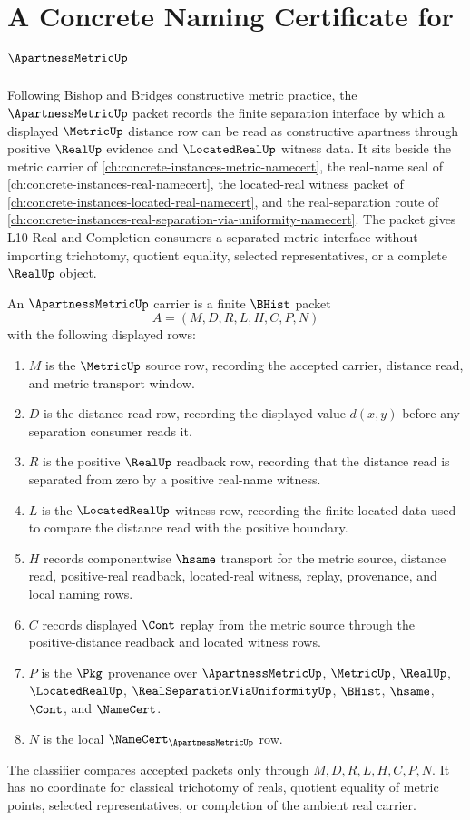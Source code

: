 \chapter{A Concrete Naming Certificate for $\ApartnessMetricUp$}
\label{ch:concrete-instances-apartness-metric-namecert}

Following Bishop and Bridges constructive metric practice, the $\ApartnessMetricUp$ packet records the finite separation interface by which a displayed $\MetricUp$ distance row can be read as constructive apartness through positive $\RealUp$ evidence and $\LocatedRealUp$ witness data. It sits beside the metric carrier of \autoref{ch:concrete-instances-metric-namecert}, the real-name seal of \autoref{ch:concrete-instances-real-namecert}, the located-real witness packet of \autoref{ch:concrete-instances-located-real-namecert}, and the real-separation route of \autoref{ch:concrete-instances-real-separation-via-uniformity-namecert}. The packet gives L10 Real and Completion consumers a separated-metric interface without importing trichotomy, quotient equality, selected representatives, or a complete $\RealUp$ object.

\begin{definition}
\label{def:apartness-metric-carrier}
An $\ApartnessMetricUp$ carrier is a finite $\BHist$ packet
$$
A=(M,D,R,L,H,C,P,N)
$$
with the following displayed rows:
\begin{enumerate}
\item $M$ is the $\MetricUp$ source row, recording the accepted carrier, distance read, and metric transport window.
\item $D$ is the distance-read row, recording the displayed value $d(x,y)$ before any separation consumer reads it.
\item $R$ is the positive $\RealUp$ readback row, recording that the distance read is separated from zero by a positive real-name witness.
\item $L$ is the $\LocatedRealUp$ witness row, recording the finite located data used to compare the distance read with the positive boundary.
\item $H$ records componentwise $\hsame$ transport for the metric source, distance read, positive-real readback, located-real witness, replay, provenance, and local naming rows.
\item $C$ records displayed $\Cont$ replay from the metric source through the positive-distance readback and located witness rows.
\item $P$ is the $\Pkg$ provenance over $\ApartnessMetricUp$, $\MetricUp$, $\RealUp$, $\LocatedRealUp$, $\RealSeparationViaUniformityUp$, $\BHist$, $\hsame$, $\Cont$, and $\NameCert$.
\item $N$ is the local $\NameCert_{\ApartnessMetricUp}$ row.
\end{enumerate}
The classifier compares accepted packets only through $M,D,R,L,H,C,P,N$. It has no coordinate for classical trichotomy of reals, quotient equality of metric points, selected representatives, or completion of the ambient real carrier.
\end{definition}

